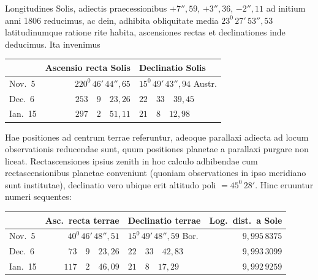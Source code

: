 Longitudines Solis, adiectis praecessionibus $+7''{,}59$, $+3''{,}36$, $-2''{,}11$ ad initium anni 1806 reducimus, ac dein, adhibita obliquitate media $23^{0}\,27'\,53''{,}53$ latitudinumque ratione rite habita, ascensiones rectas et declinationes inde deducimus. Ita invenimus
\begin{center}
\begingroup\small\setlength{\tabcolsep}{5pt}\renewcommand{\arraystretch}{1.2}
\begin{tabular}{|l|r|l|}\hline
& Ascensio recta Solis & Declinatio Solis\\\hline
Nov.\ 5 & $220^{0}\,46'\,44''{,}65$ & $15^{0}\,49'\,43''{,}94$ Austr.\\
Dec.\ 6 & $253\quad9\quad23{,}26$ & $22\quad33\quad39{,}45$\\
Ian.\ 15 & $297\quad2\quad51{,}11$ & $21\quad8\quad12{,}98$\\\hline
\end{tabular}\endgroup
\end{center}

Hae positiones ad centrum terrae referuntur, adeoque parallaxi adiecta ad locum observationis reducendae sunt, quum positiones planetae a parallaxi purgare non liceat. Rectascensiones ipsius zenith in hoc calculo adhibendae cum rectascensionibus planetae conveniunt (quoniam observationes in ipso meridiano sunt institutae), declinatio vero ubique erit altitudo poli $=45^{0}\,28'$. Hinc eruuntur numeri sequentes:
\begin{center}
\begingroup\footnotesize\setlength{\tabcolsep}{3pt}\renewcommand{\arraystretch}{1.2}
\begin{tabular}{|l|r|l|r|}\hline
& Asc.\ recta terrae & Declinatio terrae & Log.\ dist.\ a Sole\\\hline
Nov.\ 5 & $40^{0}\,46'\,48''{,}51$ & $15^{0}\,49'\,48''{,}59$ Bor. & $9{,}995\,8375$\\
Dec.\ 6 & $73\quad9\quad23{,}26$ & $22\quad33\quad42{,}83$ & $9{,}993\,3099$\\
Ian.\ 15 & $117\quad2\quad46{,}09$ & $21\quad8\quad17{,}29$ & $9{,}992\,9259$\\\hline
\end{tabular}\endgroup
\end{center}

